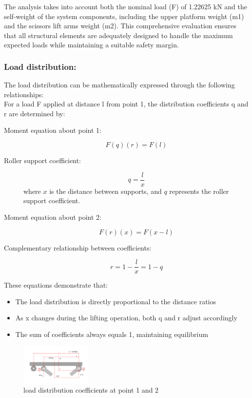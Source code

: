 \documentclass[../../main]{subfiles}
\begin{document}
The analysis takes into account both the nominal load (F) of 1.22625 kN
and the self-weight of the system components, including the upper
platform weight (m1) and the scissors lift arms weight (m2). This
comprehensive evaluation ensures that all structural elements are
adequately designed to handle the maximum expected loads while
maintaining a suitable safety margin.

\subsubsection{Load distribution:}
The load distribution can be mathematically expressed through the
following relationships:\\
For a load F applied at distance l from point 1, the distribution
coefficients q and r are determined by:
\begin{description}
  \item[Moment equation about point 1:]
    \begin{equation}
      F(q)(r) = F(l)
    \end{equation}
  
  \item[Roller support coefficient:]
    \begin{equation}
      q = \frac{l}{x}
    \end{equation}
    where $x$ is the distance between supports, and $q$ represents the roller support coefficient.
  
  \item[Moment equation about point 2:]
    \begin{equation}
      F(r)(x) = F(x-l)
    \end{equation}
  
  \item[Complementary relationship between coefficients:]
    \begin{equation}
      r = 1 - \frac{l}{x} = 1 - q
    \end{equation}
  \end{description}


These equations demonstrate that:
\begin{itemize}
\item
  The load distribution is directly proportional to the distance ratios
\item
  As x changes during the lifting operation, both q and r adjust
  accordingly
\item
  The sum of coefficients always equals 1, maintaining equilibrium
\end{itemize}
\begin{figure}[ht]
  \centering
  \includegraphics[width=0.3159\textwidth]{img/image015.png}
  \caption{load distribution coefficients at point 1 and
  2}
\end{figure}
\newpage
\end{document}
